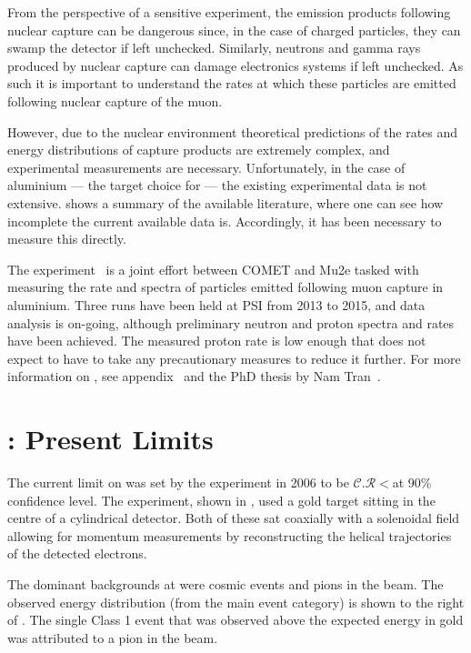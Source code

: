 From the perspective of a sensitive \mueconv experiment, the emission products following nuclear capture can be dangerous since, in the case of charged particles, they can swamp the detector if left unchecked.
Similarly, neutrons and gamma rays produced by nuclear capture can damage electronics systems if left unchecked.
As such it is important to understand the rates at which these particles are emitted following nuclear capture of the muon.

However, due to the nuclear environment theoretical predictions of the rates and energy distributions of capture products are extremely complex, and experimental measurements are necessary.
Unfortunately, in the case of aluminium --- the target choice for \COMET --- the existing experimental data is not extensive.
 shows a summary of the available literature, where one can see how incomplete the current available data is.
Accordingly, it has been necessary to measure this directly.

The \alcap experiment~\cite{AlcapProposal2012} is a joint effort between COMET and Mu2e tasked with measuring the rate and spectra of particles emitted following muon capture in aluminium.
Three runs have been held at \ac{PSI} from 2013 to 2015, and data analysis is on-going, although preliminary neutron and proton spectra and rates have been achieved.
The measured proton rate is low enough that \COMET does not expect to have to take any precautionary measures to reduce it further.
For more information on \alcap, see appendix~ and the PhD thesis by Nam Tran~\cite{NamThesis}.

\section{\sindrumII: Present Limits}
\FigMuecSindrumII
The current limit on \mueconv was set by the \sindrumII experiment in 2006 to be $\mathcal{C.R}<$\senseSindrum at 90\% confidence level.
The experiment, shown in , used a gold target sitting in the centre of a cylindrical detector.
Both of these sat coaxially with a solenoidal field allowing for momentum measurements by reconstructing the helical trajectories of the detected electrons.

The dominant backgrounds at \sindrumII were cosmic events and pions in the beam.  
The observed energy distribution (from the main event category) is shown to the right of .  
The single Class 1 event that was observed above the expected \mueconv energy in gold was attributed to a pion in the beam.
